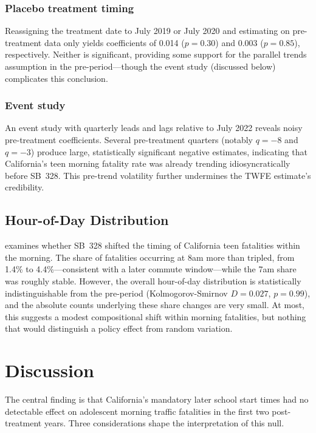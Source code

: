 \documentclass[12pt]{article}
\begin{document}
\subsubsection*{Placebo treatment timing} Reassigning the treatment date to July 2019 or July 2020 and estimating on pre-treatment data only yields coefficients of 0.014 ($p = 0.30$) and 0.003 ($p = 0.85$), respectively. Neither is significant, providing some support for the parallel trends assumption in the pre-period---though the event study (discussed below) complicates this conclusion.

\subsubsection*{Event study} An event study with quarterly leads and lags relative to July 2022 reveals noisy pre-treatment coefficients. Several pre-treatment quarters (notably $q = -8$ and $q = -3$) produce large, statistically significant negative estimates, indicating that California's teen morning fatality rate was already trending idiosyncratically before SB~328. This pre-trend volatility further undermines the TWFE estimate's credibility.

\subsection{Hour-of-Day Distribution}



 examines whether SB~328 shifted the timing of California teen fatalities within the morning. The share of fatalities occurring at 8am more than tripled, from 1.4\% to 4.4\%---consistent with a later commute window---while the 7am share was roughly stable. However, the overall hour-of-day distribution is statistically indistinguishable from the pre-period (Kolmogorov-Smirnov $D = 0.027$, $p = 0.99$), and the absolute counts underlying these share changes are very small. At most, this suggests a modest compositional shift within morning fatalities, but nothing that would distinguish a policy effect from random variation.

\section{Discussion}

The central finding is that California's mandatory later school start times had no detectable effect on adolescent morning traffic fatalities in the first two post-treatment years. Three considerations shape the interpretation of this null.
\end{document}
